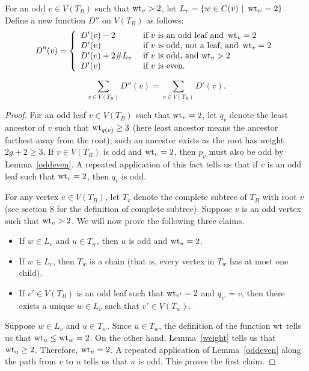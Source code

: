 For an odd $v \in V(T_B)$ such that $\operatorname{wt}_v > 2$, let $L_v = \{ w \in C(v) \ | \ \operatorname{wt}_{w} = 2  \}$. 
Define a new function $D''$ on $V(T_B)$ as follows:
\[ D''(v) = \left\{ 
\begin{array}{ll}
D'(v)-2 \ &\textup{if $v$ is an odd leaf and } \operatorname{wt}_v = 2 \\
D'(v) \ &\textup{if  $v$ is odd, not a leaf, and } \operatorname{wt}_v = 2 \\
D'(v)+2\# L_v \ &\textup{if $v$ is odd, and $\operatorname{wt}_v > 2$} \\
D'(v) \ &\textup{if $v$ is even}.
\end{array}
\right. \]

\begin{lemma}\label{newnewsum}
\[ \sum_{v \in V(T_B)} D''(v) = \sum_{v \in V(T_B)} D'(v) .\]  
\end{lemma}
\begin{proof}
For an odd leaf $v \in V(T_B)$ such that $\operatorname{wt}_v = 2$, let $q_v$ denote the least ancestor of $v$ such that $\operatorname{wt}_{q(v)} \geq 3$ (here least ancestor means the ancestor farthest away from the root); such an ancestor exists as the root has weight $2g+2 \geq 3$. If $v \in V(T_B)$ is odd and $\operatorname{wt}_v = 2$, then $p_v$ must also be odd by Lemma~\ref{oddeven}. A repeated application of this fact tells us that if $v$ is an odd leaf such that $\operatorname{wt}_v = 2$, then $q_v$ is odd. 

For any vertex $v \in V(T_B)$, let $T_v$ denote the complete subtree of $T_B$ with root $v$ (see section 8 for the definition of complete subtree). Suppose $v$ is an odd vertex such that $\operatorname{wt}_v > 2$. We will now prove the following three claims.
\begin{itemize}
 \item If $w \in L_v$ and $u \in T_w$, then $u$ is odd and $\operatorname{wt}_u = 2$.
 \item If $w \in L_v$, then $T_w$ is a chain (that is, every vertex in $T_w$ has at most one child). 
 \item If $v' \in V(T_B)$ is an odd leaf such that $\operatorname{wt}_{v'} = 2$ and $q_{v'} = v$, then there exists a unique $w \in L_v$ such that $v' \in V(T_w)$. 
\end{itemize}

Suppose $w \in L_v$ and $u \in T_w$. Since $u \in T_w$, the definition of the function $\operatorname{wt}$ tells us that $\operatorname{wt}_u \leq \operatorname{wt}_w = 2$. On the other hand, Lemma~\ref{weight} tells us that $\operatorname{wt}_u \geq 2$. Therefore, $\operatorname{wt}_u = 2$. A repeated application of Lemma~\ref{oddeven} along the path from $v$ to $u$ tells us that $u$ is odd. This proves the first claim.


\end{proof}
